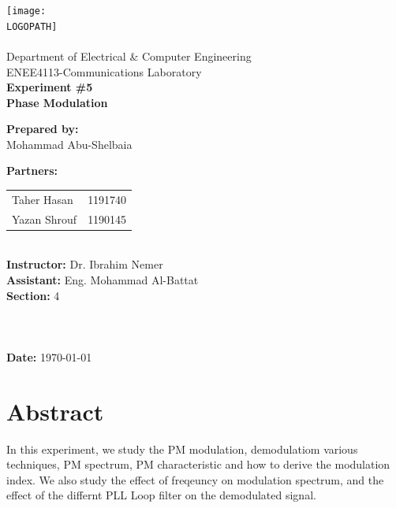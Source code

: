 \documentclass[12pt]{article}
\def \LOGOPATH {assets/img/birzeit-logo.png}
\def \DEPARTEMENT {Department of Electrical \& Computer Engineering}
\def \COURSENUM {ENEE4113}
\def \COURSENAME {Communications Laboratory}
\def \REPORTTITLE {Phase Modulation}
\def \STUDENTNAME {Mohammad Abu-Shelbaia}
\def \STUDENTID {1200198}
\def \INSTRUCTOR {Dr. Ibrahim Nemer}
\def \ASSISTANT {Eng. Mohammad Al-Battat}
\def \PARTNERAN {Taher Hasan}
\def \PARTNERAID {1191740}
\def \PARTNERBN {Yazan Shrouf}
\def \PARTNERBID {1190145}
\def \REPORTNUM {5}
\begin{document}

\begin{titlepage}
    \vfill
    \begin{center}
        \texttt{[image: \\LOGOPATH]} \\
        \hfill \\
        \Large{\DEPARTEMENT} \\
        \Large{\COURSENUM\;-\;\COURSENAME} \\
        \vfill
        \textbf{\LARGE{Experiment \#\REPORTNUM}} \\
        \textbf{\LARGE{\REPORTTITLE}}
    \end{center}
    \vfill
    \begin{flushleft}
        \Large{\textbf{Prepared by:}\\ \STUDENTNAME\quad\STUDENTID} \\
        \Large{\textbf{Partners:}\\ 
        \begin{tabular}{@{}l@{\quad}l}
            \PARTNERAN & \PARTNERAID \\
            \PARTNERBN & \PARTNERBID \\
        \end{tabular}} \\
        \Large{\textbf{Instructor:} \INSTRUCTOR} \\
        \Large{\textbf{Assistant:} \ASSISTANT} \\
        \Large{\textbf{Section:} 4}\\
        \LARGE{\textbf{ }}\\
        \LARGE{\textbf{ }}\\
        \LARGE{\textbf{ }}\\
        \Large{\textbf{Date:} \today}\\
    \end{flushleft}
    \vfill
\end{titlepage}
{
    \centering
    \section*{Abstract}
    In this experiment, we study the PM modulation, demodulatiom various techniques, PM spectrum, PM characteristic and how to derive the modulation index. We also study the effect of freqeuncy on modulation spectrum, and the effect of the differnt PLL Loop filter on the demodulated signal.
    \clearpage
}
\end{document}
